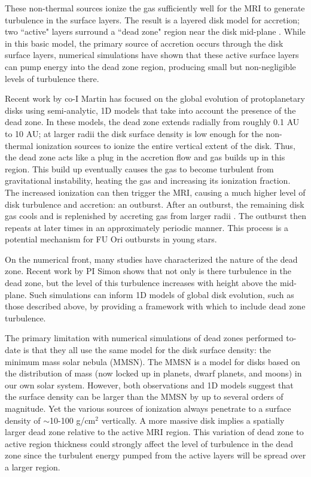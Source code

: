 \documentclass[preprint]{aastex}
\begin{document}
These non-thermal sources ionize the gas sufficiently well for the MRI to generate turbulence in the surface layers.  The result is a layered disk model for accretion; two ``active" layers surround a ``dead zone" region near the disk mid-plane \citep{gammie96}.  While in this basic model, the primary source of accretion occurs through the disk surface layers, numerical simulations \citep{fleming03,simon11b} have shown that these active surface layers can pump energy into the dead zone region, producing small but non-negligible levels of turbulence there.   

Recent work by co-I Martin has focused on the global evolution of protoplanetary disks using semi-analytic, 1D models that take into account the presence of the dead zone.  In these models, the dead zone extends radially from roughly 0.1 AU to 10 AU; at larger radii the disk surface density is low enough for the 
non-thermal ionization sources to ionize the entire vertical extent of the disk.  Thus, the dead zone acts like a plug in the accretion flow and gas builds up in this region.  This build up eventually causes the gas to become turbulent from gravitational instability, heating the gas and increasing its ionization fraction.  The increased ionization can then trigger the MRI, causing a much higher level of disk turbulence and accretion: an outburst. After an outburst, the remaining disk gas cools and is replenished by
accreting gas from larger radii \cite[e.g.,][]{armitage01,martin11,martin13,martin14}. The outburst then repeats at later times in an approximately periodic manner. This process is a potential mechanism for FU Ori outbursts in young stars.

On the numerical front, many studies have characterized the nature of the dead zone.  Recent work by PI Simon \citep{simon11b} shows that not only is there turbulence in the dead zone, but the level of this turbulence increases with height above the mid-plane.  Such simulations can inform 1D models of global disk evolution, such as those described above, by providing a framework with which to include dead zone turbulence. 

The primary limitation with numerical simulations of dead zones performed to-date is that they all use the same model for the disk surface density: the minimum mass solar nebula (MMSN).  The MMSN is a model for disks based on the distribution of mass (now locked up in planets, dwarf planets, and moons) in our own solar system.  However, both observations \cite[e.g.,][]{qi11} and 1D models \cite[e.g.,][]{martin12} suggest that the surface density can be larger than the MMSN by up to several orders of magnitude.  Yet the various sources of ionization always penetrate to a surface density of $\sim$10-100 g/cm$^2$ vertically.   A more massive disk implies a spatially larger dead zone relative to the active MRI region. This variation of dead zone to active region thickness could strongly affect the level of turbulence in the dead zone since the turbulent energy pumped from the active layers will be spread over a larger region.
\end{document}
